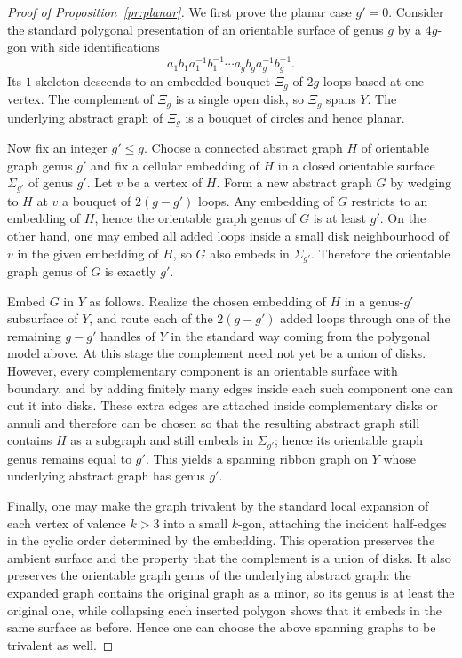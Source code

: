 \documentclass[reqno]{amsart}
\theoremstyle{definition}
\begin{document}
\begin{proof}[Proof of Proposition~\ref{pr:planar}]
We first prove the planar case $g'=0$. Consider the standard polygonal presentation of an orientable surface of genus $g$ by a $4g$-gon with side identifications
\[
a_1b_1a_1^{-1}b_1^{-1}\cdots a_gb_ga_g^{-1}b_g^{-1}.
\]
Its $1$-skeleton descends to an embedded bouquet $\Xi_g$ of $2g$ loops based at one vertex. The complement of $\Xi_g$ is a single open disk, so $\Xi_g$ spans $Y$. The underlying abstract graph of $\Xi_g$ is a bouquet of circles and hence planar.

Now fix an integer $g'\le g$. Choose a connected abstract graph $H$ of orientable graph genus $g'$ and fix a cellular embedding of $H$ in a closed orientable surface $\Sigma_{g'}$ of genus $g'$. Let $v$ be a vertex of $H$. Form a new abstract graph $G$ by wedging to $H$ at $v$ a bouquet of $2(g-g')$ loops. Any embedding of $G$ restricts to an embedding of $H$, hence the orientable graph genus of $G$ is at least $g'$. On the other hand, one may embed all added loops inside a small disk neighbourhood of $v$ in the given embedding of $H$, so $G$ also embeds in $\Sigma_{g'}$. Therefore the orientable graph genus of $G$ is exactly $g'$.

Embed $G$ in $Y$ as follows. Realize the chosen embedding of $H$ in a genus-$g'$ subsurface of $Y$, and route each of the $2(g-g')$ added loops through one of the remaining $g-g'$ handles of $Y$ in the standard way coming from the polygonal model above. At this stage the complement need not yet be a union of disks. However, every complementary component is an orientable surface with boundary, and by adding finitely many edges inside each such component one can cut it into disks. These extra edges are attached inside complementary disks or annuli and therefore can be chosen so that the resulting abstract graph still contains $H$ as a subgraph and still embeds in $\Sigma_{g'}$; hence its orientable graph genus remains equal to $g'$. This yields a spanning ribbon graph on $Y$ whose underlying abstract graph has genus $g'$.

Finally, one may make the graph trivalent by the standard local expansion of each vertex of valence $k>3$ into a small $k$-gon, attaching the incident half-edges in the cyclic order determined by the embedding. This operation preserves the ambient surface and the property that the complement is a union of disks. It also preserves the orientable graph genus of the underlying abstract graph: the expanded graph contains the original graph as a minor, so its genus is at least the original one, while collapsing each inserted polygon shows that it embeds in the same surface as before. Hence one can choose the above spanning graphs to be trivalent as well.
\end{proof}
\end{document}
